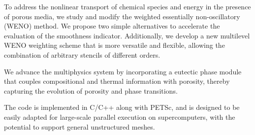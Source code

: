 To address the nonlinear transport of chemical species and energy in the 
presence of porous media, we study and modify the weighted essentially 
non-oscillatory (WENO) method.
We propose two simple alternatives to accelerate the evaluation of the 
smoothness indicator. Additionally, we develop a new multilevel WENO weighting 
scheme that is more versatile and flexible, allowing the combination of 
arbitrary stencils of different orders.

We advance the multiphysics system by incorporating a eutectic phase module that
 couples compositional and thermal information with porosity, thereby capturing 
the evolution of porosity and phase transitions.

The code is implemented in C/C++ along with PETSc, 
and is designed to be easily adapted 
for large-scale parallel execution on supercomputers,
 with the potential to support general unstructured meshes.
